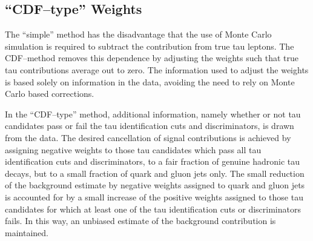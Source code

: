\subsection{``CDF--type'' Weights}
\label{secBgEstFakeRate_frCDFtypeWeights}
%
%
The ``simple'' method has the disadvantage that the use of Monte Carlo
simulation is required to subtract the contribution from true tau leptons.  The
CDF--method removes this dependence by adjusting the weights such that true tau
contributions average out to zero. The information used to adjust the weights is
based solely on information in the data, avoiding the need to rely on Monte
Carlo based corrections.

In the ``CDF--type'' method, additional information, namely whether or not
tau candidates pass or fail the tau identification cuts and discriminators,
is drawn from the data.  The desired cancellation of signal contributions is
achieved by assigning negative weights to those tau candidates which pass
all tau identification cuts and discriminators, \ie to a fair fraction of
genuine hadronic tau decays, but to a small fraction of quark and gluon jets
only.  The small reduction of the background estimate by negative weights
assigned to quark and gluon jets is accounted for by a small increase of the
positive weights assigned to those tau candidates for which at least one of
the tau identification cuts or discriminators fails.  In this way, an unbiased
estimate of the background contribution is maintained.

